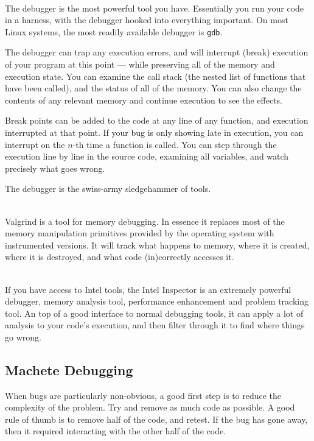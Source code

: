 \documentclass[a4paper,notitlepage,dvipsnames]{scrreprt}
\newcommand\headitem[1]{\needspace{1.5\baselineskip}\item[{\boldmath #1 \nopagebreak}] \hfill \\ \nopagebreak}
\let\code\lstinline
\begin{document}
{{{	\begin{description}
		\headitem{Debuggers}
			The debugger is the most powerful tool you have. Essentially you
			run your code in a harness, with the debugger hooked into
			everything important. On most Linux systems, the most readily
			available debugger is \code{gdb}.

			The debugger can trap any execution errors, and will interrupt
			(break) execution of your program at this point --- while
			preserving all of the memory and execution state. You can examine
			the call stack (the nested list of functions that have been
			called), and the status of all of the memory. You can also change
			the contents of any relevant memory and continue execution to see
			the effects.

			Break points can be added to the code at any line of any function,
			and execution interrupted at that point. If your bug is only
			showing late in execution, you can interrupt on the $n$-th time
			a function is called. You can step through the execution line by
			line in the source code, examining all variables, and watch
			precisely what goes wrong.

			The debugger is the swiss-army sledgehammer of tools.

		\headitem{Valgrind}
			Valgrind is a tool for memory debugging. In essence it replaces
			most of the memory manipulation primitives provided by the
			operating system with instrumented versions. It will track what
			happens to memory, where it is created, where it is destroyed,
			and what code (in)correctly accesses it.

		\headitem{Intel Inspector XE}
			If you have access to Intel tools, the Intel Inspector is an
			extremely powerful debugger, memory analysis tool, performance
			enhancement and problem tracking tool. An top of a good interface
			to normal debugging tools, it can apply a lot of
			analysis to your code's execution, and then filter through it to
			find where things go wrong.
	\end{description}

\subsection{Machete Debugging}
	When bugs are particularly non-obvious, a good first step is to reduce the
	complexity of the problem. Try and remove as much code as possible. A good
	rule of thumb is to remove half of the code, and retest. If the bug has
	gone away, then it required interacting with the other half of the code.

}}}
\end{document}
